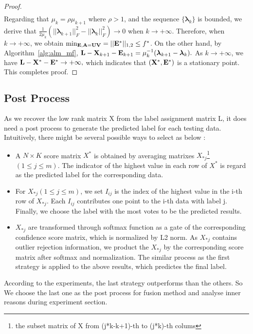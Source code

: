 \documentclass[letterpaper]{article}
\def\bE{{\bf E}}
\def\blambda{{\bm \lambda}}
\def\bL{{\bf L}}
\def\bU{{\bf U}}
\def\bV{{\bf V}}
\def\bX{{\bf X}}
\def\bA{{\bf A}}
\def\bX{{\bf X}}
\begin{document}
\begin{proof}
\begin{align}
    \end{align}
    \indent
    Regarding that $\mu_{k} = \rho \mu_{k+1}$ where $\rho > 1$, and the sequence $\{ \blambda_k \}$ is bounded, we derive that
    $\frac{1}{2\mu_k} (|| \blambda_{k+1} ||_F^2 - || \blambda_{k} ||_F^2) \rightarrow 0$ when $k \rightarrow +\infty .$
    Therefore, when $k \rightarrow +\infty$, we obtain $\min_{\bE, \bA = \bU \bV} = || \bE^* ||_{1,2} \leq f^*$.
    On the other hand, by Algorithm~\ref{alg:alm_mf}, $\bL - \bX_{k+1} - \bE_{k+1} = \mu_k^{-1} (\blambda_{k+1} - \blambda_{k}) .$
    As $k \rightarrow +\infty$, we have $\bL - \bX^* - \bE^* \rightarrow +\infty  ,$
    which indicates that $(\bX^*, \bE^*)$ is a stationary point.
    This completes proof.
\end{proof}




\subsection{Post Process}
As we recover the low rank matrix X from the label assignment matrix L,
it does need a post process to generate the predicted label for each testing data.
Intuitively, there might be several possible ways to select as below : 
\begin{itemize}
  \item A $N\times K$ score matrix $X^{*}$ is obtained by averaging matrixes $X_{*j}$\footnote{the subset matrix of X from (j*k-k+1)-th to (j*k)-th colums} $(1{\leq}j{\leq}m)$. 
		The indicator of the highest value in each row of $X^{*}$ is regard as the predicted label for the corresponding data.
  \item For $X_{*j} (1{\leq}j{\leq}m)$, we set $I_{ij}$ is the index of the highest value in the i-th row of $X_{*j}$.
  		Each $I_{ij}$ contributes one point to the i-th data with label j. 
  		Finally, we choose the label with the most votes to be the predicted results.
  \item $X_{*j}$ are transformed through softmax function as a gate of the corresponding confidence score matrix, which is normalized by L2 norm. 
  		As $X_{*j}$ contains outlier rejection information, we product the $X_{*j}$ by the corresponding score matrix after softmax and normalization.
  		The similar process as the first strategy is applied to the above results, which predictes the final label.
\end{itemize}
According to the experiments, the last strategy outperforms than the others. 
So We choose the last one as the post process for fusion method and analyse inner reasons during experiment section.
\end{document}

